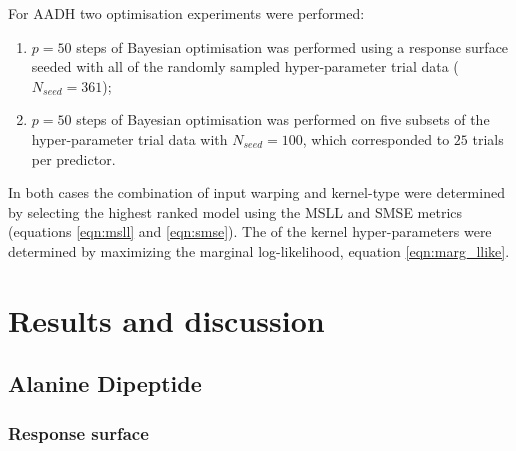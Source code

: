For AADH two optimisation experiments were performed:
\begin{enumerate}
    \item $p=50$ steps of Bayesian optimisation was performed using a response surface seeded with all of the randomly sampled hyper-parameter trial data ($N_{seed}=361$);
    \item $p=50$ steps of Bayesian optimisation was performed on five subsets  of the hyper-parameter trial data with  $N_{seed}=100$, which corresponded to $25$ trials per predictor.
\end{enumerate} 

In both cases the combination of input warping and kernel-type  were determined by selecting the highest ranked model using the MSLL and SMSE metrics (equations \ref{eqn:msll} and \ref{eqn:smse}). The of the kernel hyper-parameters were determined by maximizing the marginal log-likelihood, equation \ref{eqn:marg_llike}. 

\section{Results and discussion}
\subsection{Alanine Dipeptide}\label{subsec:ala1}
\subsubsection{Response surface}\label{subsubsec:ala_rsm}

